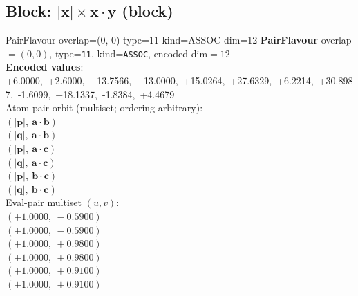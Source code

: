 \documentclass[a4paper,11pt]{article}
\newcommand{\vc}[1]{\ensuremath{\mathbf{#1}}}
\newcommand{\dnfagmiihhiejm}[1]{|\vc{#1}|}
\newcommand{\pdcegfomjfhook}[2]{\mathbf{#1} \cdot \mathbf{#2}}
\begin{document}
\subsection{Block: $\dnfagmiihhiejm{x} \times \pdcegfomjfhook{x}{y}$  (block)}
    PairFlavour  overlap=(0, 0)  type=11  kind=ASSOC  dim=12
\textbf{PairFlavour} overlap$=(0, 0)$, type=\texttt{11}, kind=\texttt{ASSOC}, encoded dim$=12$\\
\textbf{      Encoded values}: +6.0000,\ +2.6000,\ +13.7566,\ +13.0000,\ +15.0264,\ +27.6329,\ +6.2214,\ +30.8987,\ -1.6099,\ +18.1337,\ -1.8384,\ +4.4679\\
\quad Atom-pair orbit (multiset; ordering arbitrary):\\
$(\dnfagmiihhiejm{p},\ \pdcegfomjfhook{a}{b})$\\
$(\dnfagmiihhiejm{q},\ \pdcegfomjfhook{a}{b})$\\
$(\dnfagmiihhiejm{p},\ \pdcegfomjfhook{a}{c})$\\
$(\dnfagmiihhiejm{q},\ \pdcegfomjfhook{a}{c})$\\
$(\dnfagmiihhiejm{p},\ \pdcegfomjfhook{b}{c})$\\
$(\dnfagmiihhiejm{q},\ \pdcegfomjfhook{b}{c})$\\
\quad Eval-pair multiset $(u, v)$:\\
$(+1.0000,\ -0.5900)$\\
$(+1.0000,\ -0.5900)$\\
$(+1.0000,\ +0.9800)$\\
$(+1.0000,\ +0.9800)$\\
$(+1.0000,\ +0.9100)$\\
$(+1.0000,\ +0.9100)$\\
\end{document}

